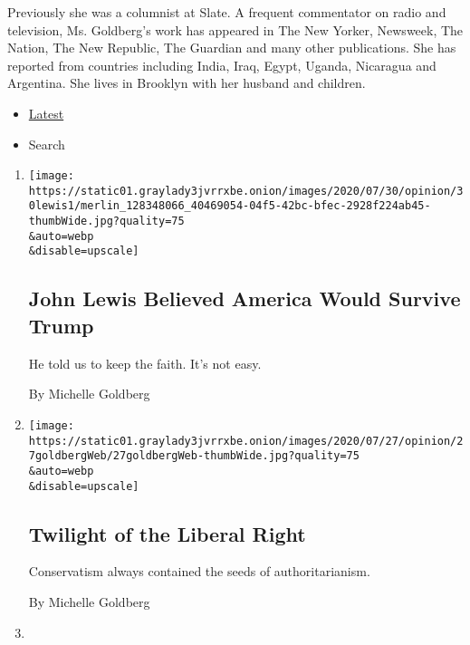 Previously she was a columnist at Slate. A frequent commentator on radio
and television, Ms. Goldberg's work has appeared in The New Yorker,
Newsweek, The Nation, The New Republic, The Guardian and many other
publications. She has reported from countries including India, Iraq,
Egypt, Uganda, Nicaragua and Argentina. She lives in Brooklyn with her
husband and children. ~

\begin{itemize}
\tightlist
\item
  \protect\hyperlink{stream-panel}{Latest}
\item
  Search
\end{itemize}

\begin{enumerate}
\def\labelenumi{\arabic{enumi}.}
\item
  \href{/2020/07/30/opinion/john-lewis-legacy.html}{}

  \texttt{[image: https://static01.graylady3jvrrxbe.onion/images/2020/07/30/opinion/30lewis1/merlin\_128348066\_40469054-04f5-42bc-bfec-2928f224ab45-thumbWide.jpg?quality=75\\\&auto=webp\\\&disable=upscale]}

  \hypertarget{john-lewis-believed-america-would-survive-trump}{%
  \subsection{John Lewis Believed America Would Survive
  Trump}\label{john-lewis-believed-america-would-survive-trump}}

  He told us to keep the faith. It's not easy.

  By Michelle Goldberg
\item
  \href{/2020/07/27/opinion/anne-applebaum-twilight-of-democracy.html}{}

  \texttt{[image: https://static01.graylady3jvrrxbe.onion/images/2020/07/27/opinion/27goldbergWeb/27goldbergWeb-thumbWide.jpg?quality=75\\\&auto=webp\\\&disable=upscale]}

  \hypertarget{twilight-of-the-liberal-right}{%
  \subsection{Twilight of the Liberal
  Right}\label{twilight-of-the-liberal-right}}

  Conservatism always contained the seeds of authoritarianism.

  By Michelle Goldberg
\item
  \href{/2020/07/20/opinion/portland-protests-trump.html}{}


\end{enumerate}
